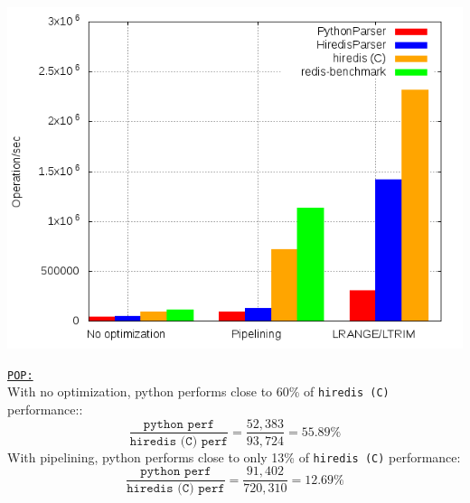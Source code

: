 \documentclass[a4paper, 11pt]{report}
\begin{document}
\begin{minipage}{0.55\linewidth}
    \includegraphics[width=1.0\linewidth]{plots/poping.png}
\end{minipage}
\begin{minipage}{0.4\linewidth}
    \underline{\texttt{POP:}}\\

    With no optimization, python performs close to 60\% of \texttt{hiredis (C)} performance::
    $$\frac{\texttt{python perf}}{\texttt{hiredis (C) perf}}=\frac{52,383}{93,724}=55.89\%$$
    With pipelining, python performs close to only 13\% of \texttt{hiredis (C)} performance:
    $$\frac{\texttt{python perf}}{\texttt{hiredis (C) perf}}=\frac{91,402}{720,310}=12.69\%$$
\end{minipage}
\end{document}
